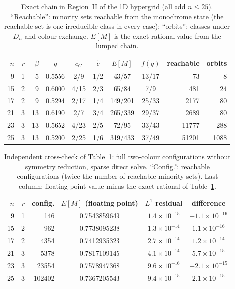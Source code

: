 \documentclass[pdflatex,sn-mathphys-num]{sn-jnl}
\theoremstyle{thmstyleone}%
\theoremstyle{thmstylethree}%
\theoremstyle{thmstyletwo}%
\newcommand{\ctil}{\tilde{c}}
\newcommand{\cG}{c_G}
\begin{document}
\begin{table}[t]
\caption{Exact chain in Region~II of the 1D hypergrid (all odd $n\le25$).
``Reachable'': minority sets reachable from the monochrome state
(the reachable set is one irreducible class in every case); ``orbits'':
classes under $D_n$ and colour exchange. $E[M]$ is the exact rational
value from the lumped chain.}
\label{tab:smexact}
\centering
\small
\begin{tabular}{rrrcccccrr}
\toprule
$n$ & $r$ & $\beta$ & $q$ & $\cG$ & $\ctil$ & $E[M]$ & $f(q)$ & reachable & orbits\\
\midrule
 9 & 1 &  5 & 0.5556 & 2/9  & 1/2 & 43/57   & 13/17 &    73 &    8\\
15 & 2 &  9 & 0.6000 & 4/15 & 2/3 & 65/84   & 7/9   &   481 &   24\\
17 & 2 &  9 & 0.5294 & 2/17 & 1/4 & 149/201 & 25/33 &  2177 &   80\\
21 & 3 & 13 & 0.6190 & 2/7  & 3/4 & 265/339 & 29/37 &  2689 &   80\\
23 & 3 & 13 & 0.5652 & 4/23 & 2/5 & 72/95   & 33/43 & 11777 &  288\\
25 & 3 & 13 & 0.5200 & 2/25 & 1/6 & 319/433 & 37/49 & 51201 & 1088\\
\bottomrule
\end{tabular}
\end{table}

\begin{table}[t]
\caption{Independent cross-check of Table~\ref{tab:smexact}: full
two-colour configurations without symmetry reduction, sparse direct solve.
``Config.'': reachable configurations (twice the number of reachable
minority sets). Last column: floating-point value minus the exact
rational of Table~\ref{tab:smexact}.}
\label{tab:smcheck}
\centering
\small
\begin{tabular}{rrrccc}
\toprule
$n$ & $r$ & config. & $E[M]$ (floating point) & $L^1$ residual & difference\\
\midrule
9 & 1 & 146 & 0.7543859649 & $1.4\times10^{-15}$ & $-1.1\times10^{-16}$\\
15 & 2 & 962 & 0.7738095238 & $1.3\times10^{-14}$ & $1.1\times10^{-16}$\\
17 & 2 & 4354 & 0.7412935323 & $2.7\times10^{-14}$ & $1.2\times10^{-14}$\\
21 & 3 & 5378 & 0.7817109145 & $4.1\times10^{-14}$ & $5.7\times10^{-15}$\\
23 & 3 & 23554 & 0.7578947368 & $9.6\times10^{-16}$ & $-2.1\times10^{-15}$\\
25 & 3 & 102402 & 0.7367205543 & $9.4\times10^{-15}$ & $2.1\times10^{-15}$\\
\bottomrule
\end{tabular}
\end{table}
\end{document}
